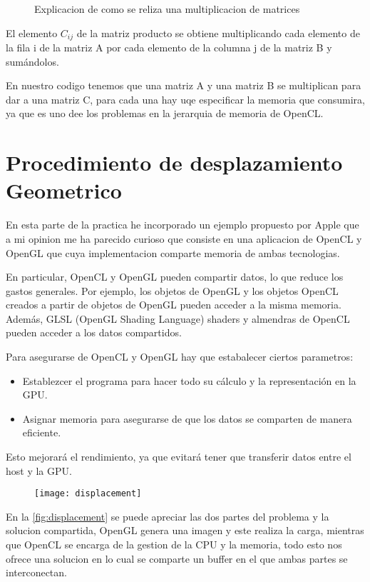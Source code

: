 \begin{figure}
\centering
{}
\caption{Explicacion de como se reliza una multiplicacion de matrices}
\label{fig:matrixmul}
\end{figure}



El elemento $C_{ij}$ de la matriz producto se obtiene multiplicando cada elemento de la fila i de la matriz A por cada elemento de la columna j de la matriz B y sumándolos.

En nuestro codigo tenemos que una matriz A y una matriz B se multiplican para dar a una matriz C, para cada una hay uqe especificar la memoria que consumira, ya que es uno dee los problemas en la jerarquia de memoria de OpenCL.

\section{Procedimiento de desplazamiento Geometrico}

En esta parte de la practica he incorporado un ejemplo propuesto por Apple que a mi opinion me ha parecido curioso que consiste en una aplicacion de OpenCL y OpenGL que cuya implementacion comparte memoria de ambas tecnologias.

En particular, OpenCL y OpenGL pueden compartir datos, lo que reduce los gastos generales. Por ejemplo, los objetos de OpenGL y los objetos OpenCL creados a partir de objetos de OpenGL pueden acceder a la misma memoria. Además, GLSL (OpenGL Shading Language) shaders y almendras de OpenCL pueden acceder a los datos compartidos.

Para asegurarse de OpenCL y OpenGL hay que estabalecer ciertos parametros:
\begin{itemize}
	\item Establezcer el programa para hacer todo su cálculo y la representación en la GPU.
	\item Asignar memoria para asegurarse de que los datos se comparten de manera eficiente.
\end{itemize}

Esto mejorará el rendimiento, ya que evitará tener que transferir datos entre el host y la GPU.

\begin{figure}[h!]
\centering
\texttt{[image: displacement]}
\caption{}
\label{fig:displacement}
\end{figure}

En la  \autoref{fig:displacement} se puede apreciar las dos partes del problema y la solucion compartida, OpenGL genera una imagen y este realiza la carga, mientras que OpenCL se encarga de la gestion de la CPU y la memoria, todo esto nos ofrece una solucion en lo cual se comparte un buffer en el que ambas partes se interconectan.